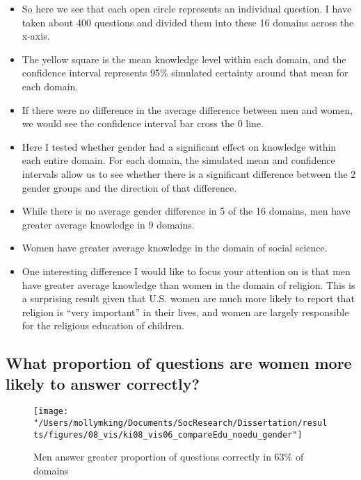 \documentclass[]{article}
\begin{document}
\begin{itemize}
  \item{So here we see that each open circle represents an individual question. I have taken about 400 questions and divided them into these 16 domains across the x-axis.}
  \item{The yellow square is the mean knowledge level within each domain, and the confidence interval represents 95\% simulated certainty around that mean for each domain.}
  \item{If there were no difference in the average difference between men and women, we would see the confidence interval bar cross the 0 line.}
  \item{Here I tested whether gender had a significant effect on knowledge within each entire domain. For each domain, the simulated mean and confidence intervals allow us to see whether there is a significant difference between the 2 gender groups and the direction of that difference.}
  \item{While there is no average gender difference in 5 of the 16 domains, men have greater average knowledge in 9 domains.}
  \item{Women have greater average knowledge in the domain of social science.}
  \item{One interesting difference I would like to focus your attention on is that men have greater average knowledge than women in the domain of religion. This is a surprising result given that U.S. women are much more likely to report that religion is ``very important'' in their lives, and women are largely responsible for the religious education of children.}
\end{itemize}

\newpage
\subsection{What proportion of questions are women more likely to answer correctly?}
\begin{figure}[ht]
    \begin{center}
      \texttt{[image: "/Users/mollymking/Documents/SocResearch/Dissertation/results/figures/08\_vis/ki08\_vis06\_compareEdu\_noedu\_gender"]}
      \caption{Men answer greater proportion of questions correctly in 63\% of domains}
    \end{center}
\end{figure}
\end{document}
